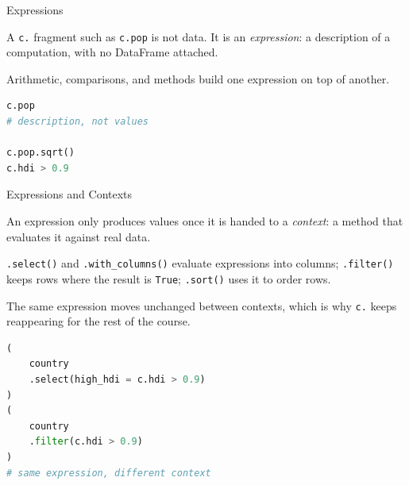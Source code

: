 \documentclass[8pt,aspectratio=169]{beamer}
\begin{document}
\begin{frame}[fragile]{Expressions}
\begin{splitcode}{%

A \texttt{c.} fragment such as \texttt{c.pop} is not data. It is an \textit{expression}: a description of a computation, with no DataFrame attached.

Arithmetic, comparisons, and methods build one expression on top of another.

}
\begin{lstlisting}[language=Python]
c.pop
# description, not values

c.pop.sqrt()
c.hdi > 0.9
\end{lstlisting}
\end{splitcode}
\end{frame}

\begin{frame}[fragile]{Expressions and Contexts}
\begin{splitcode}{%

An expression only produces values once it is handed to a \textit{context}: a method that evaluates it against real data.

\texttt{.select()} and \texttt{.with\_columns()} evaluate expressions into columns; \texttt{.filter()} keeps rows where the result is \texttt{True}; \texttt{.sort()} uses it to order rows.

The same expression moves unchanged between contexts, which is why \texttt{c.} keeps reappearing for the rest of the course.

}
\begin{lstlisting}[language=Python]
(
    country
    .select(high_hdi = c.hdi > 0.9)
)
(
    country
    .filter(c.hdi > 0.9)
)
# same expression, different context
\end{lstlisting}
\end{splitcode}
\end{frame}
\end{document}
